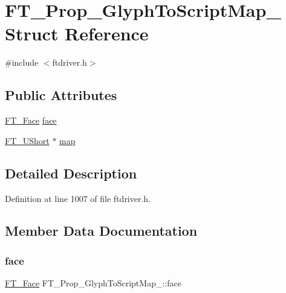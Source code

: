 \hypertarget{struct_f_t___prop___glyph_to_script_map__}{}\section{F\+T\+\_\+\+Prop\+\_\+\+Glyph\+To\+Script\+Map\+\_\+ Struct Reference}
\label{struct_f_t___prop___glyph_to_script_map__}


{\ttfamily \#include $<$ftdriver.\+h$>$}

\subsection*{Public Attributes}
\begin{DoxyCompactItemize}
\item 
\mbox{\hyperlink{freetype_8h_a7eba045ee20968354fa1bff0f69740fa}{F\+T\+\_\+\+Face}} \mbox{\hyperlink{struct_f_t___prop___glyph_to_script_map___a08fa6630173f5351bf5bf8e54ab0adcf}{face}}
\item 
\mbox{\hyperlink{fttypes_8h_a937f6c17cf5ffd09086d8610c37b9f58}{F\+T\+\_\+\+U\+Short}} $\ast$ \mbox{\hyperlink{struct_f_t___prop___glyph_to_script_map___ab7e1c8285f5263a6c4b03ac8d2fb029d}{map}}
\end{DoxyCompactItemize}


\subsection{Detailed Description}


Definition at line 1007 of file ftdriver.\+h.



\subsection{Member Data Documentation}
\mbox{\label{struct_f_t___prop___glyph_to_script_map___a08fa6630173f5351bf5bf8e54ab0adcf}} 
\subsubsection{\texorpdfstring{face}{face}}
{\footnotesize\ttfamily \mbox{\hyperlink{freetype_8h_a7eba045ee20968354fa1bff0f69740fa}{F\+T\+\_\+\+Face}} F\+T\+\_\+\+Prop\+\_\+\+Glyph\+To\+Script\+Map\+\_\+\+::face}



